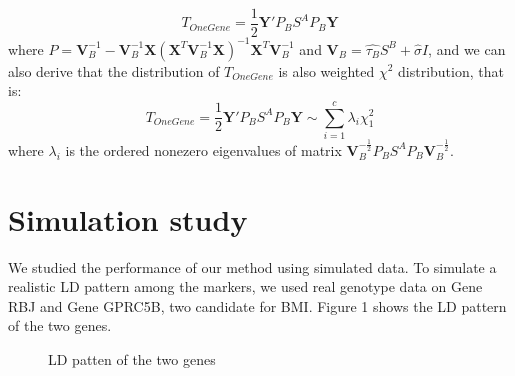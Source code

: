 \documentclass{article}
\newcommand{\Y}{\mathbf{Y}}
\newcommand{\X}{\mathbf{X}}
\newcommand{\V}{\mathbf{V}}
\newcommand{\VV}{\mathbf{V}^{-1}}
\begin{document}
        \[
            T_{OneGene}=\frac{1}{2}\Y'P_BS^{A}P_B\Y
        \]
        where $P=\VV_B-\VV_B\X(\X^T\VV_B\X)^{-1}\X^T\VV_B$ and $\V_B=\hat{\tau_B}S^B+\hat{\sigma}I$, and we can also derive that the distribution of $T_{OneGene}$ is also weighted $\chi^2$ distribution, that is:
        \[
            T_{OneGene}=\frac{1}{2}\Y'P_BS^{A}P_B\Y\sim\sum_{i=1}^c\lambda_i\chi^2_1
        \]
        where $\lambda_i$ is the  ordered nonezero eigenvalues of matrix $\V_B^{-\frac{1}{2}}P_BS^{A}P_B\V_B^{-\frac{1}{2}}$.

    \section{Simulation study}

        We studied the performance of our method using simulated data. To simulate a realistic LD pattern among the markers, we used real genotype data on Gene RBJ and Gene GPRC5B, two candidate for BMI. Figure 1 shows the LD pattern of the two genes.

        \begin{figure}[htbp]
            \centering
            \hspace{10pt}
            \caption{LD patten of the two genes}
        \end{figure}
\end{document}
